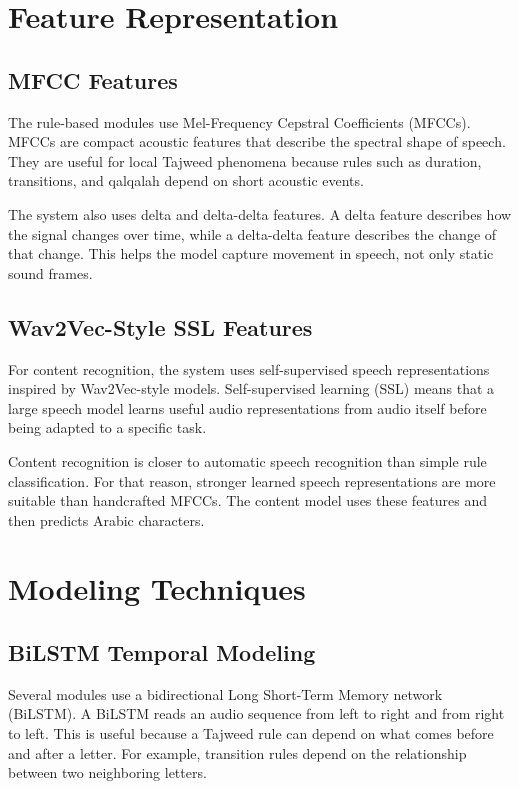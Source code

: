 \section{Feature Representation}

\subsection{MFCC Features}

The rule-based modules use Mel-Frequency Cepstral Coefficients (MFCCs). MFCCs
are compact acoustic features that describe the spectral shape of speech. They
are useful for local Tajweed phenomena because rules such as duration,
transitions, and qalqalah depend on short acoustic events.

The system also uses delta and delta-delta features. A delta feature describes
how the signal changes over time, while a delta-delta feature describes the
change of that change. This helps the model capture movement in speech, not
only static sound frames.

\subsection{Wav2Vec-Style SSL Features}

For content recognition, the system uses self-supervised speech representations
inspired by Wav2Vec-style models. Self-supervised learning (SSL) means that a
large speech model learns useful audio representations from audio itself before
being adapted to a specific task.

Content recognition is closer to automatic speech recognition than simple rule
classification. For that reason, stronger learned speech representations are
more suitable than handcrafted MFCCs. The content model uses these features and
then predicts Arabic characters.

\section{Modeling Techniques}

\subsection{BiLSTM Temporal Modeling}

Several modules use a bidirectional Long Short-Term Memory network (BiLSTM). A
BiLSTM reads an audio sequence from left to right and from right to left. This
is useful because a Tajweed rule can depend on what comes before and after a
letter. For example, transition rules depend on the relationship between two
neighboring letters.

